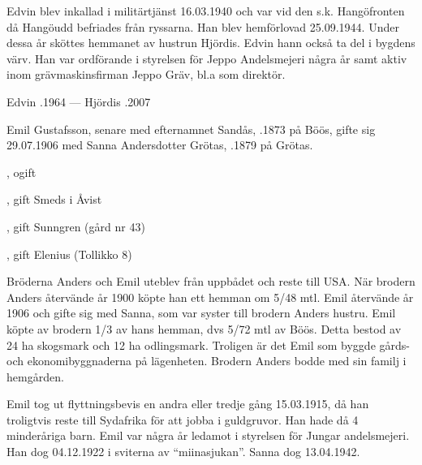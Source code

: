 Edvin blev inkallad i militärtjänst 16.03.1940 och var vid den s.k. Hangöfronten då Hangöudd befriades från ryssarna. Han blev hemförlovad 25.09.1944. Under dessa år sköttes hemmanet av hustrun Hjördis. Edvin hann också ta del i bygdens värv. Han var ordförande i styrelsen för Jeppo Andelsmejeri några år samt aktiv inom grävmaskinsfirman Jeppo Gräv, bl.a som direktör.

Edvin .1964  ---  Hjördis .2007



Emil Gustafsson, senare med efternamnet Sandås, .1873 på Böös, gifte sig 29.07.1906 med Sanna Andersdotter Grötas, .1879 på Grötas.
\begin{jhchildren}
  \item {}, ogift
  \item {}, gift Smeds i Åvist
  \item {}
  \item {}, gift Sunngren (gård nr 43)
  \item {}, gift Elenius (Tollikko 8)
  \item {}
\end{jhchildren}

Bröderna Anders och Emil  uteblev från uppbådet och reste till USA. När brodern Anders återvände år 1900 köpte han ett hemman om 5/48 mtl. Emil återvände år 1906 och gifte sig med Sanna, som var syster till brodern Anders hustru. Emil köpte av brodern 1/3 av hans hemman, dvs 5/72 mtl av Böös. Detta bestod av 24 ha skogsmark och 12 ha odlingsmark. Troligen är det Emil som byggde gårds- och ekonomibyggnaderna på lägenheten. Brodern Anders bodde med sin familj i hemgården.

Emil tog ut flyttningsbevis en andra eller tredje gång 15.03.1915, då han troligtvis reste till Sydafrika för att jobba i guldgruvor. Han hade då 4 minderåriga barn. Emil var några år ledamot i styrelsen för Jungar andelsmejeri. Han dog 04.12.1922 i sviterna av ``miinasjukan''. Sanna dog 13.04.1942.

